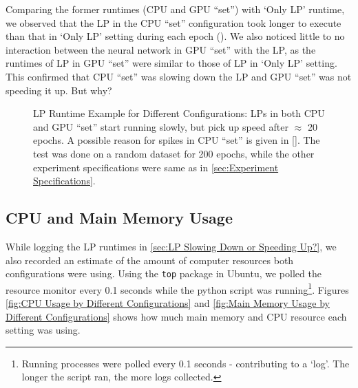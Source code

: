 \begin{appendices}
    Comparing the former runtimes (CPU and GPU ``set'') with `Only LP' runtime, we observed that the LP in the CPU ``set'' configuration took longer to execute than that in `Only LP' setting during each epoch (). We also noticed little to no interaction between the neural network in GPU ``set'' with the LP, as the runtimes of LP in GPU ``set'' were similar to those of LP in `Only LP' setting. This confirmed that CPU ``set'' was slowing down the LP and GPU ``set'' was not speeding it up. But why?
    \begin{figure}[!htbp]
        \centering
        \caption[LP Runtime Example for Different Configurations]{LP Runtime Example for Different Configurations: LPs in both CPU and GPU ``set'' start running slowly, but pick up speed after $\approx$ 20 epochs. A possible reason for spikes in CPU ``set'' is given in []. The test was done on a random dataset for 200 epochs, while the other experiment specifications were same as in \cref{sec:Experiment Specifications}.}
        \label{fig:LP Runtime Example for Different Configurations}
    \end{figure}
    
    \subsection{CPU and Main Memory Usage} \label{app:CPU and Main Memory Usage}
    While logging the LP runtimes in \cref{sec:LP Slowing Down or Speeding Up?}, we also recorded an estimate of the amount of computer resources both configurations were using. Using the \texttt{top} package in Ubuntu, we polled the resource monitor every 0.1 seconds while the python script was running\footnote{\label{foo:logs not epochs} Running processes were polled every 0.1 seconds - contributing to a `log'. The longer the script ran, the more logs collected.}. Figures \ref{fig:CPU Usage by Different Configurations} and \ref{fig:Main Memory Usage by Different Configurations} shows how much main memory and CPU resource each setting was using.
    

\end{appendices}
